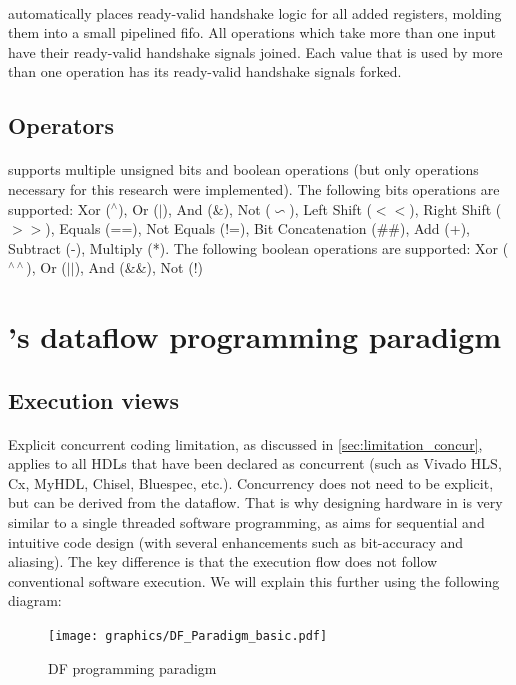 \paragraph{}\cf automatically places ready-valid handshake logic for all added registers, molding them into a small pipelined fifo. All operations which take more than one input have their ready-valid handshake signals joined. Each value that is used by more than one operation has its ready-valid handshake signals forked.


\subsection{Operators}
\label{subsec:operators}
\paragraph{}\cf supports multiple unsigned bits and boolean operations (but only operations necessary for this research were implemented). The following bits operations are supported: Xor ($^\wedge$), Or ($\vert$), And (\&), Not ($\backsim$), Left Shift ($<<$), Right Shift ($>>$), Equals (==), Not Equals (!=), Bit Concatenation (\#\#), Add (+), Subtract (-), Multiply (*). The following boolean operations are supported: Xor ($^{\wedge\wedge}$), Or ($\vert\vert$), And (\&\&), Not (!)

\newpage
\section{\cfns's dataflow programming paradigm}
\label{sec:df_prog_paradigm}

\subsection{Execution views}
\paragraph{}Explicit concurrent coding limitation, as discussed in \autoref{sec:limitation_concur}, applies to all HDLs that have been declared as concurrent (such as Vivado HLS, Cx, MyHDL, Chisel, Bluespec, etc.). Concurrency does not need to be explicit, but can be derived from the dataflow. That is why designing hardware in \cf is very similar to a single threaded software programming, as \cf aims for sequential and intuitive code design (with several enhancements such as bit-accuracy and aliasing). The key difference is that the execution flow does not follow conventional software execution.
We will explain this further using the following diagram:
\begin{figure}[h]
  \centering
  \texttt{[image: graphics/DF\_Paradigm\_basic.pdf]}
  \caption{DF programming paradigm}\label{fig:DF_Paradigm_basic}
\end{figure}
